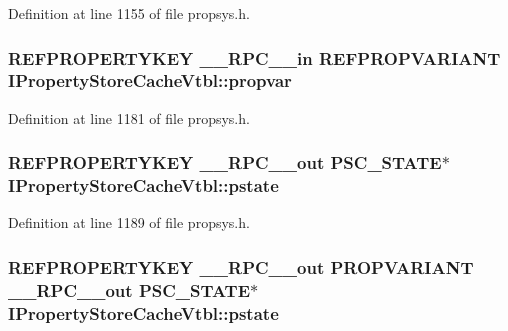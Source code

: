 Definition at line 1155 of file propsys.\+h.

\subsubsection[{\texorpdfstring{propvar}{propvar}}]{ {\bf R\+E\+F\+P\+R\+O\+P\+E\+R\+T\+Y\+K\+EY} {\bf \+\_\+\+\_\+\+R\+P\+C\+\_\+\+\_\+in} {\bf R\+E\+F\+P\+R\+O\+P\+V\+A\+R\+I\+A\+NT} I\+Property\+Store\+Cache\+Vtbl\+::propvar}\hypertarget{struct_i_property_store_cache_vtbl_ae8331e7e24430ce2eb83905d209ee82e}{}\label{struct_i_property_store_cache_vtbl_ae8331e7e24430ce2eb83905d209ee82e}


Definition at line 1181 of file propsys.\+h.

\subsubsection[{\texorpdfstring{pstate}{pstate}}]{ {\bf R\+E\+F\+P\+R\+O\+P\+E\+R\+T\+Y\+K\+EY} {\bf \+\_\+\+\_\+\+R\+P\+C\+\_\+\+\_\+out} {\bf P\+S\+C\+\_\+\+S\+T\+A\+TE}$\ast$ I\+Property\+Store\+Cache\+Vtbl\+::pstate}\hypertarget{struct_i_property_store_cache_vtbl_a7affdc3bec147165e95bb1718f9a1ede}{}\label{struct_i_property_store_cache_vtbl_a7affdc3bec147165e95bb1718f9a1ede}


Definition at line 1189 of file propsys.\+h.

\subsubsection[{\texorpdfstring{pstate}{pstate}}]{ {\bf R\+E\+F\+P\+R\+O\+P\+E\+R\+T\+Y\+K\+EY} {\bf \+\_\+\+\_\+\+R\+P\+C\+\_\+\+\_\+out} {\bf P\+R\+O\+P\+V\+A\+R\+I\+A\+NT} {\bf \+\_\+\+\_\+\+R\+P\+C\+\_\+\+\_\+out} {\bf P\+S\+C\+\_\+\+S\+T\+A\+TE}$\ast$ I\+Property\+Store\+Cache\+Vtbl\+::pstate}\hypertarget{struct_i_property_store_cache_vtbl_a3d39e41d085b34a986a398638754cf34}{}\label{struct_i_property_store_cache_vtbl_a3d39e41d085b34a986a398638754cf34}


